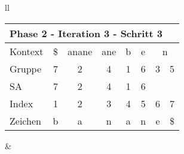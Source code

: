 \begin{table}[H]
\begin{adjustbox}{max width=\textwidth}
\begin{tabular}{ll}
\begin{tabular}{lccccccc}
\multicolumn{8}{l}{Phase 2 - Iteration 3 - Schritt 3}                                                                                                                                                                \\ \hline
\multicolumn{1}{l|}{Kontext} & \multicolumn{1}{c|}{\$} & \multicolumn{1}{c|}{anane} & \multicolumn{1}{c|}{\cellcolor[HTML]{\green}ane} & \multicolumn{1}{c|}{b}    & \multicolumn{1}{c|}{e} & \multicolumn{2}{c}{n} \\
\multicolumn{1}{l|}{Gruppe}  & \multicolumn{1}{c|}{7}  & \multicolumn{1}{c|}{2}     & \multicolumn{1}{c|}{\cellcolor[HTML]{\green}4}   & \multicolumn{1}{c|}{1}    & \multicolumn{1}{c|}{6} & 3         & 5          \\ 
\multicolumn{1}{l|}{SA}      & \multicolumn{1}{c|}{7}  & \multicolumn{1}{c|}{2}     & \multicolumn{1}{c|}{\cellcolor[HTML]{\green}4}   & \multicolumn{1}{c|}{1}    & \multicolumn{1}{c|}{6} &           &            \\ \hline
\multicolumn{1}{l|}{Index}   & 1                       & 2                          & \cellcolor[HTML]{\blue}3                        & \cellcolor[HTML]{\green}4 & 5                      & 6         & 7          \\
\multicolumn{1}{l|}{Zeichen} & b                       & a                          & \cellcolor[HTML]{\blue}n                        & \cellcolor[HTML]{\green}a & n                      & e         & \$        
\end{tabular}

&


\end{tabular}
\end{adjustbox}
\end{table}
